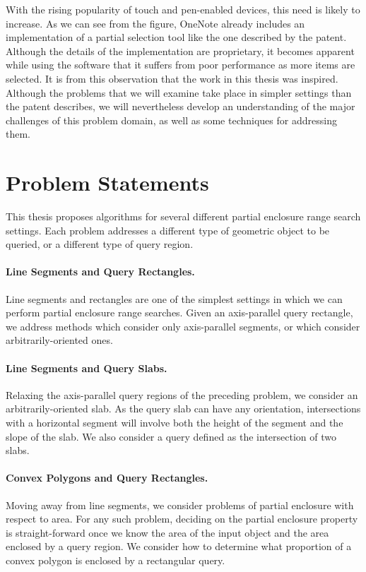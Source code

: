 \noindent With the rising popularity of touch and pen-enabled devices, this need is likely to increase.  
As we can see from the figure, OneNote already includes an implementation of a partial selection tool like the one described by the patent. 
Although the details of the implementation are proprietary, it becomes apparent while using the software that it suffers from poor performance as more items are selected.
It is from this observation that the work in this thesis was inspired.  
Although the problems that we will examine take place in simpler settings than the patent describes, we will nevertheless develop an understanding of the major challenges of this problem domain, as well as some techniques for addressing them.


\section{Problem Statements}
\label{:intro:problems}

This thesis proposes algorithms for several different partial enclosure range search settings.  Each problem addresses a different type of geometric object to be queried, or a different type of query region.

\paragraph{Line Segments and Query Rectangles.} Line segments and rectangles are one of the simplest settings in which we can perform partial enclosure range searches. 
Given an axis-parallel query rectangle, we address methods which consider only axis-parallel segments, or which consider arbitrarily-oriented ones.

\paragraph{Line Segments and Query Slabs.} Relaxing the axis-parallel query regions of the preceding problem, we consider an arbitrarily-oriented slab.
As the query slab can have any orientation, intersections with a horizontal segment will involve both the height of the segment and the slope of the slab.  
We also consider a query defined as the intersection of two slabs.

\paragraph{Convex Polygons and Query Rectangles.} Moving away from line segments, we consider problems of partial enclosure with respect to area.  
For any such problem, deciding on the partial enclosure property is straight-forward once we know the area of the input object and the area enclosed by a query region.  
We consider how to determine what proportion of a convex polygon is enclosed by a rectangular query.
 

